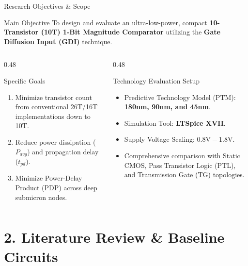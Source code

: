\documentclass[aspectratio=169,10pt]{beamer}
\begin{document}
\begin{frame}{Research Objectives \& Scope}
  \begin{alertblock}{Main Objective}
    To design and evaluate an ultra-low-power, compact \textbf{10-Transistor (10T) 1-Bit Magnitude Comparator} utilizing the \textbf{Gate Diffusion Input (GDI)} technique.
  \end{alertblock}
  \pause
  \begin{columns}[T]
    \begin{column}{0.48\textwidth}
      \begin{block}{Specific Goals}
        \begin{enumerate}
          \item Minimize transistor count from conventional 26T/16T implementations down to 10T.
          \item Reduce power dissipation ($P_{avg}$) and propagation delay ($t_{pd}$).
          \item Minimize Power-Delay Product (PDP) across deep submicron nodes.
        \end{enumerate}
      \end{block}
    \end{column}
    \pause
    \begin{column}{0.48\textwidth}
      \begin{block}{Technology Evaluation Setup}
        \begin{itemize}
          \item Predictive Technology Model (PTM): \textbf{180nm, 90nm, and 45nm}.
          \item Simulation Tool: \textbf{LTSpice XVII}.
          \item Supply Voltage Scaling: $0.8\text{V} - 1.8\text{V}$.
          \item Comprehensive comparison with Static CMOS, Pass Transistor Logic (PTL), and Transmission Gate (TG) topologies.
        \end{itemize}
      \end{block}
    \end{column}
  \end{columns}
\end{frame}

\section{2. Literature Review \& Baseline Circuits}
\end{document}
